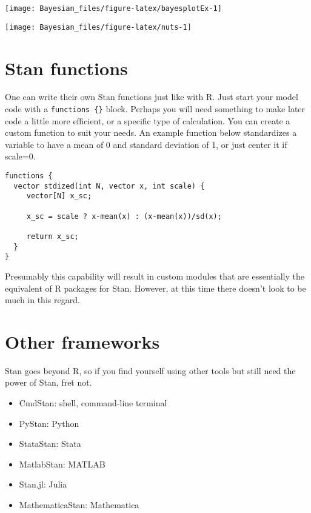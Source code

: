 \documentclass[]{book}
\providecommand{\tightlist}{%
  \setlength{\itemsep}{0pt}\setlength{\parskip}{0pt}}
\begin{document}

\begin{center}\texttt{[image: Bayesian\_files/figure-latex/bayesplotEx-1]} \end{center}

\begin{center}\texttt{[image: Bayesian\_files/figure-latex/nuts-1]} \end{center}

\section{Stan functions}\label{stan-functions}

One can write their own Stan functions just like with R. Just start your
model code with a \texttt{functions\ \{\}} block. Perhaps you will need
something to make later code a little more efficient, or a specific type
of calculation. You can create a custom function to suit your needs. An
example function below standardizes a variable to have a mean of 0 and
standard deviation of 1, or just center it if scale=0.

\begin{verbatim}
functions {
  vector stdized(int N, vector x, int scale) {
     vector[N] x_sc;

     x_sc = scale ? x-mean(x) : (x-mean(x))/sd(x);
     
     return x_sc;
  }
}
\end{verbatim}

Presumably this capability will result in custom modules that are
essentially the equivalent of R packages for Stan. However, at this time
there doesn't look to be much in this regard.

\section{Other frameworks}\label{other-frameworks}

Stan goes beyond R, so if you find yourself using other tools but still
need the power of Stan, fret not.

\begin{itemize}
\tightlist
\item
  {CmdStan}: shell, command-line terminal
\item
  {PyStan}: Python
\item
  {StataStan}: Stata
\item
  {MatlabStan}: MATLAB
\item
  {Stan.jl}: Julia
\item
  {MathematicaStan}: Mathematica
\end{itemize}
\end{document}

